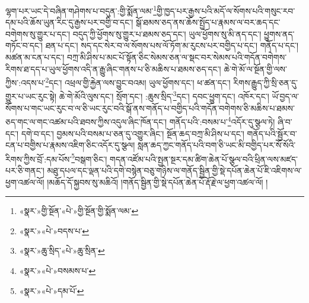 ལྷག་པར་ཡང་དེ་བཞིན་གཤེགས་པ་བདུན་:གྱི་སྨོན་ལམ་\footnote{«སྣར་»གྱི་སྔོན་«པེ་»གྱི་སྔོན་གྱི་སྨོན་ལམ་}གྱི་ཁྱད་པར་རྒྱས་པའི་མདོ་ལ་སོགས་པའི་གསུང་རབ་དམ་པའི་ཆོས་ཡུན་རིང་དུ་རྒྱས་པར་བགྱི་བ་དང་། སྒོ་ཐམས་ཅད་ནས་ཆོས་སྤྱོད་པ་རྣམས་ལ་བར་ཆད་དང་བགེགས་སུ་གྱུར་པ་དང་། བདུད་ཀྱི་ཕྱོགས་སུ་གྱུར་པ་ཐམས་ཅད་དང་། ཡུལ་ཕྱོགས་སུ་མི་ནད་དང་། ཕྱུགས་ནད་གཏོང་བ་དང་། ཐན་པ་དང་། སད་དང་སེར་བ་ལ་སོགས་པས་ལོ་ཏོག་མ་རུངས་པར་བགྱིད་པ་དང་། གནོད་པ་དང་། མཚན་མ་ངན་པ་དང་། བཀྲ་མི་ཤིས་པ་མང་པོ་སྟོན་ཅིང་སེམས་ཅན་ལ་སྡང་བར་སེམས་པའི་གདོན་བགེགས་རིགས་ཐ་དད་པ་ཡུལ་ཕྱོགས་འདི་ན་རྒྱུ་ཞིང་གནས་པ་ཅི་མཆིས་པ་ཐམས་ཅད་དང་། ཆེ་གེ་མོ་ལ་སྔོན་གྱི་ལས་ཀྱིས་:འདས་པ་\footnote{«སྣར་»«པེ་»བདས་པ་}དང་། འཕྲལ་གྱི་རྐྱེན་ལས་བྱུང་བའམ། ཡུལ་ཕྱོགས་དང་། ཕ་ཚན་དང་། རིགས་རྒྱུད་ཀྱི་སྲི་ཅན་དུ་གྱུར་པ་ཡང་རུང་སྟེ། ཆེ་གེ་མོའི་ལུས་དང་། སྲོག་དང་། :ཆུས་སྲིད་\footnote{«སྣར་»ཆུ་སྲིད་«པེ་»ཆུ་སྲིན་}དང་། དབང་ཕྱུག་དང་། འཁོར་དང་། ཡོ་བྱད་ལ་སོགས་པ་གང་ཡང་རུང་བ་ལ་ཅི་ཡང་རུང་བའི་སྒོ་ནས་གནོད་པ་བགྱིད་པའི་གདོན་བགེགས་ཅི་མཆིས་པ་ཐམས་ཅད་གང་ལ་གང་འཚམ་པའི་ཐབས་ཀྱིས་འདུལ་ཞིང་ཁོན་དང་། གནོད་པའི་:བསམ་པ་\footnote{«སྣར་»«པེ་»བསམས་པ་}འདོར་དུ་སྩལ་ཏེ། ཞི་བ་དང་། དགེ་བ་དང་། བྱམས་པའི་བསམ་པ་ཅན་དུ་འགྱུར་ཞིང་། སྔོན་ཆད་བཀྲ་མི་ཤིས་པ་དང་། གནོད་པའི་སྦྱོར་བ་ངན་པ་བགྱིས་པ་རྣམས་འཇིག་ཅིང་འདོར་དུ་སྩལ། སླན་ཆད་ཀྱང་གནོད་པའི་བག་ཅི་ཡང་མི་བགྱིད་པར་སོ་སོའི་རིགས་ཀྱིས་བྲོ་:དམ་པོས་\footnote{«སྣར་»«པེ་»དམ་པོ་}བསྒག་ཅིང་། གདན་འཛོམ་པའི་སྤྱན་སྔར་དམ་ཚིག་ཆེན་པོ་སྩལ་བའི་ཕྲིན་ལས་མཛད་པར་ཅི་གནང་། མཐུ་དཔལ་དང་ལྡན་པའི་དགེ་བསྙེན་བཅུ་གཉིས་ལ་གནོད་སྦྱིན་གྱི་སྡེ་དཔོན་ཆེན་པོ་ཇི་འཇིགས་ལ་ཕྱག་འཚལ་ལོ། །མཆོད་དོ་སྐྱབས་སུ་མཆིའོ། །གནོད་སྦྱིན་གྱི་སྡེ་དཔོན་ཆེན་པོ་རྡོ་རྗེ་ལ་ཕྱག་འཚལ་ལོ། །
